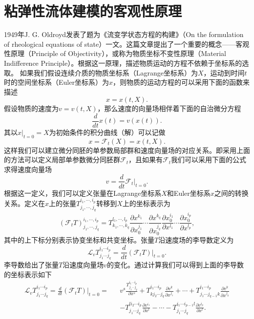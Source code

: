 \section{粘弹性流体建模的客观性原理}
1949年J. G. Oldroyd发表了题为《流变学状态方程的构建》（On the formulation of rheological equations of state）一文\cite{oldroyd1950formulation}。这篇文章提出了一个重要的概念——客观性原理（Principle of Objectivity），或称为物质坐标不变性原理（Material Indifference Principle）。根据这一原理，描述物质运动的方程不依赖于坐标系的选取。
如果我们假设连续介质的物质坐标系（Lagrange坐标系）为$X$，运动到时间$t$时的空间坐标系（Euler坐标系）为$x$，则物质的运动方程的可以采用下面的函数来描述
\begin{equation*}
	x = x (t,X).
\end{equation*}
假设物质的速度为$v = v (t,X)$，那么速度的向量场相伴着下面的自治微分方程
\begin{equation*}
	\frac{d}{dt} x(t) = v (x(t)).
\end{equation*}
其以$x|_{t=0}=X$为初始条件的积分曲线（解）可以记做
\begin{equation*}
	x = \mathcal{F}_t (X) = x (t,X).
\end{equation*}
这样我们可以建立微分同胚的单参数局部群和速度向量场的对应关系。即采用上面的方法可以定义局部单参数微分同胚群$\mathcal{F}_t$，且如果有$\mathcal{F}_t$我们可以采用下面的公式求得速度向量场
\begin{equation*}
	v = \frac{d}{dt} \mathcal{F}_t \big|_{t=0}.
\end{equation*}
根据这一定义，我们可以定义张量在Lagrange坐标系$X$和Euler坐标系$x$之间的转换关系。定义在$x$上的张量$T^{i_1,\cdots,i_p}_{j_1, \cdots,j_q}$转移到$X$上的坐标表示为
\begin{equation*}
	(\mathcal{F}_t T)^{i_1,\cdots,i_p}_{j_1, \cdots,j_q} = T^{l_1,\cdots,l_p}_{k_1, \cdots,k_q} \frac{\partial x^{k_1}}{\partial x_0^{j_1}} \cdots \frac{\partial x^{k_q}}{\partial x_0^{j_q}} \frac{\partial x_0^{i_1}}{\partial x^{l_1}} \cdots \frac{\partial x_0^{i_p}}{\partial x^{l_p}},  
\end{equation*}
其中的上下标分别表示协变坐标和共变坐标。张量$T$沿速度场的李导数定义为
\begin{equation*}
	{\mathcal{L}_v T^{i_1 \cdots i_p}_{j_1 \cdots j_q} =\frac{d}{dt} (\mathcal{F}_t T)} |_{t=0}.
\end{equation*}
李导数给出了张量$T$沿速度向量场$v$的变化。通过计算我们可以得到上面的李导数的坐标表示如下
\begin{eqnarray} \label{eq:Lie}
	 {\mathcal{L}_v T^{i_1 \cdots i_p}_{j_1 \cdots j_q} = \frac{d}{dt} (\mathcal{F}_t T)} |_{t=0}  = && v^s \frac{T^{i_1 \cdots i_p}_{j_1\cdots j_q}}{\partial x^s} + T^{i_1 \cdots i_p}_{k j_2 \cdots j_q}\frac{\partial v^k}{\partial x^{j_1}} + \cdots + T^{i_1 \cdots i_p}_{j_1\cdots j_{q-1}k}\frac{\partial v^k}{\partial x^{j_q}} \nonumber
	\\ && - T^{li_2 \cdots i_p}_{j_1\cdots j_q}\frac{\partial v^{i_1}}{\partial x^l}- \cdots - T^{i_1 \cdots i_{p-1}l}_{j_1\cdots j_q}\frac{\partial v^{i_p}}{\partial x^l}. 
\end{eqnarray}

